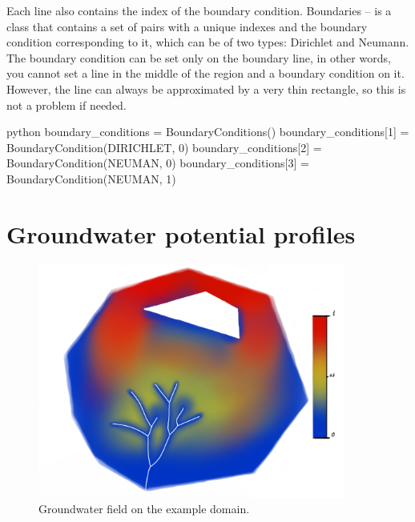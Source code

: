 \documentclass[]{pracamgr}
\begin{document}
      Each line also contains the index of the boundary condition. Boundaries -- is a class that contains a set of pairs with a unique indexes and the boundary condition corresponding to it, which can be of two types: Dirichlet and Neumann. The boundary condition can be set only on the boundary line, in other words, you cannot set a line in the middle of the region and a boundary condition on it. However, the line can always be approximated by a very thin rectangle, so this is not a problem if needed.

      \begin{mintedbox}{python}
        boundary_conditions = BoundaryConditions()
        boundary_conditions[1] = BoundaryCondition(DIRICHLET, 0)
        boundary_conditions[2] = BoundaryCondition(NEUMAN, 0)
        boundary_conditions[3] = BoundaryCondition(NEUMAN, 1)\end{mintedbox}

    \section{Groundwater potential profiles}

      \begin{figure}[H]
        \centering
        \includegraphics[width=0.9\textwidth]{figs/solver.png}        
        \caption {Groundwater field on the example domain.}
        \label{solver}
      \end{figure}
\end{document}
